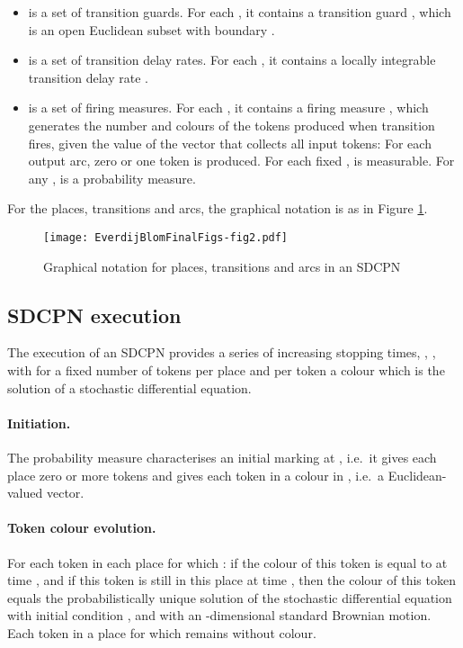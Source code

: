\documentclass[copyright,creativecommons]{eptcs}
\begin{document}
\begin{itemize}
\item  is a set of
      transition guards. For each , it contains a transition guard , which is an open
      Euclidean subset with boundary .

\item  is a set of
      transition delay rates. For each , it contains
      a locally integrable transition delay rate .

\item  is a set of firing
      measures. For each ,
      it contains a firing measure , which
      generates the number and colours of the tokens produced when
      transition  fires, given the value of the vector
      that collects all input tokens:
      For each output arc, zero or one token is
      produced.
      For each fixed , 
      is measurable. For any ,  is a probability
      measure.

\end{itemize}
For the places, transitions and arcs, the graphical notation is as
in Figure \ref{fig:graphPTA}.

\begin{figure}[h!bt]
\begin{center}
\texttt{[image: EverdijBlomFinalFigs-fig2.pdf]}
\end{center}
\caption{Graphical notation for places, transitions and arcs in an SDCPN}
\label{fig:graphPTA}
\end{figure}


\subsection{SDCPN execution}
\label{subsec:SDCPN execution}

The execution of an SDCPN provides a series of increasing stopping
times, , , with for  a fixed number of tokens per place and per
token a colour which is the solution of a stochastic differential
equation.

\paragraph{Initiation.}
The probability measure  characterises an initial
marking at , i.e.\ it gives each place  zero or more tokens and gives each token in  a colour in
, i.e.\ a Euclidean-valued vector.

\paragraph{Token colour evolution.}
For each token in each place  for which : if the colour of this token is equal to  at
time , and if this token is still in this place at time
, then the colour  of this token equals the
probabilistically unique solution of the stochastic differential
equation  with initial condition , and with  an -dimensional standard
Brownian motion. Each token in a place for which  remains without colour.
\end{document}
